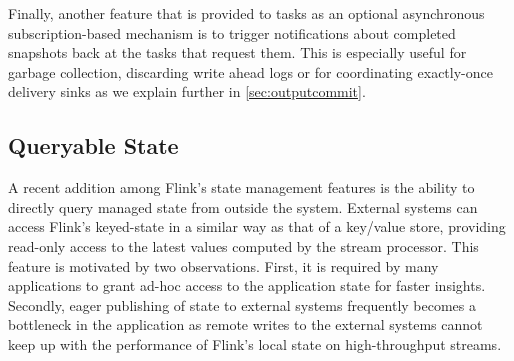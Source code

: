 
Finally, another feature that is provided to tasks as an optional asynchronous subscription-based mechanism is to trigger notifications about completed snapshots back at the tasks that request them. This is especially useful for garbage collection, discarding write ahead logs or for coordinating exactly-once delivery sinks as we explain further in \autoref{sec:outputcommit}.

\subsection{Queryable State}

A recent addition among Flink's state management features is the ability to directly query managed state from outside the system. External systems can access Flink's keyed-state in a similar way as that of a key/value store, providing read-only access to the latest values computed by the stream processor. This feature is motivated by two observations. First, it is required by many applications to grant ad-hoc access to the application state for faster insights. Secondly, eager publishing of state to external systems frequently becomes a bottleneck in the application as remote writes to the external systems cannot keep up with the performance of Flink's local state on high-throughput streams.

